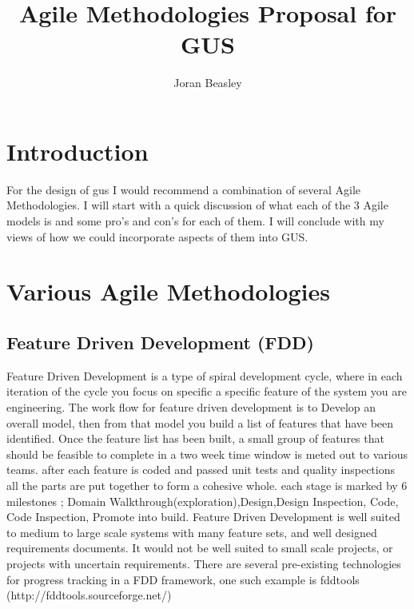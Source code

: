 \documentclass[10pt]{article}
\author{Joran Beasley}
\title{Agile Methodologies Proposal for GUS}
\date{}
\begin{document}
\maketitle
\tableofcontents
\section*{Introduction}
	For the design of gus I would recommend a combination of several Agile Methodologies.  I will start with a quick discussion of what each of the 3 Agile models is and some pro's and con's for each of them. I will conclude with my views of how we could incorporate aspects of them into GUS.
\section*{Various Agile Methodologies}
\subsection*{Feature Driven Development (FDD)}
Feature Driven Development is a type of spiral development cycle, where in each iteration of the cycle you focus on specific a specific feature of the system you are engineering. The work flow for feature driven development is to Develop an overall model, then from that model you build a list of features that have been identified. Once the feature list has been built, a small group of features that should be feasible to complete in a two week time window is meted out to various teams.  after each feature is coded and passed unit tests and quality inspections all the parts are put together to form a cohesive whole. each stage is marked by 6 milestones ; Domain Walkthrough(exploration),Design,Design Inspection, Code, Code Inspection, Promote into build.  Feature Driven Development is well suited to medium to large scale systems with many feature sets, and well designed requirements documents. It would not be well suited to small scale projects, or projects with uncertain requirements.  There are several pre-existing technologies for progress tracking in a FDD framework, one such example is fddtools (http://fddtools.sourceforge.net/)
\end{document}
